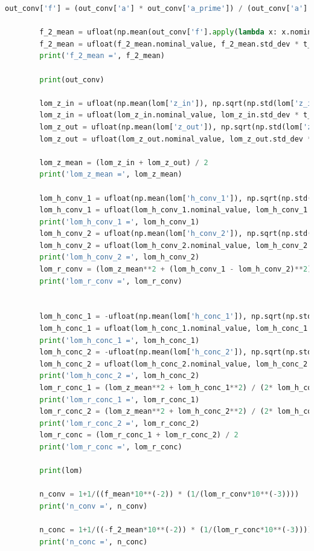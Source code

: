 \documentclass[a4paper,11pt]{article}
\begin{document}
\begin{lstlisting}[language=Python, basicstyle=\tiny, breaklines=true, postbreak=\mbox{\textbackslashspace}]
        out_conv['f'] = (out_conv['a'] * out_conv['a_prime']) / (out_conv['a'] - out_conv['a_prime'])

        f_2_mean = ufloat(np.mean(out_conv['f'].apply(lambda x: x.nominal_value)), np.sqrt(np.std(out_conv['f'].apply(lambda x: x.nominal_value))**2 + np.mean(out_conv['f'].apply(lambda x: x.std_dev))**2))
        f_2_mean = ufloat(f_2_mean.nominal_value, f_2_mean.std_dev * t_coeff(len(out_conv['f'])))
        print('f_2_mean =', f_2_mean)

        print(out_conv)

        lom_z_in = ufloat(np.mean(lom['z_in']), np.sqrt(np.std(lom['z_in'])**2 + 0.01**2))
        lom_z_in = ufloat(lom_z_in.nominal_value, lom_z_in.std_dev * t_coeff(len(lom['z_in'])))
        lom_z_out = ufloat(np.mean(lom['z_out']), np.sqrt(np.std(lom['z_out'])**2 + 0.01**2))
        lom_z_out = ufloat(lom_z_out.nominal_value, lom_z_out.std_dev * t_coeff(len(lom['z_out'])))

        lom_z_mean = (lom_z_in + lom_z_out) / 2
        print('lom_z_mean =', lom_z_mean)

        lom_h_conv_1 = ufloat(np.mean(lom['h_conv_1']), np.sqrt(np.std(lom['h_conv_1'])**2 + 0.01**2))
        lom_h_conv_1 = ufloat(lom_h_conv_1.nominal_value, lom_h_conv_1.std_dev * t_coeff(len(lom['h_conv_1'])))
        print('lom_h_conv_1 =', lom_h_conv_1)
        lom_h_conv_2 = ufloat(np.mean(lom['h_conv_2']), np.sqrt(np.std(lom['h_conv_2'])**2 + 0.01**2))
        lom_h_conv_2 = ufloat(lom_h_conv_2.nominal_value, lom_h_conv_2.std_dev * t_coeff(len(lom['h_conv_2'])))
        print('lom_h_conv_2 =', lom_h_conv_2)
        lom_r_conv = (lom_z_mean**2 + (lom_h_conv_1 - lom_h_conv_2)**2) / (2* (lom_h_conv_1 - lom_h_conv_2))
        print('lom_r_conv =', lom_r_conv)


        lom_h_conc_1 = -ufloat(np.mean(lom['h_conc_1']), np.sqrt(np.std(lom['h_conc_1'])**2 + 0.01**2))
        lom_h_conc_1 = ufloat(lom_h_conc_1.nominal_value, lom_h_conc_1.std_dev * t_coeff(len(lom['h_conc_1'])))
        print('lom_h_conc_1 =', lom_h_conc_1)
        lom_h_conc_2 = -ufloat(np.mean(lom['h_conc_2']), np.sqrt(np.std(lom['h_conc_2'])**2 + 0.01**2))
        lom_h_conc_2 = ufloat(lom_h_conc_2.nominal_value, lom_h_conc_2.std_dev * t_coeff(len(lom['h_conc_2'])))
        print('lom_h_conc_2 =', lom_h_conc_2)
        lom_r_conc_1 = (lom_z_mean**2 + lom_h_conc_1**2) / (2* lom_h_conc_1)
        print('lom_r_conc_1 =', lom_r_conc_1)
        lom_r_conc_2 = (lom_z_mean**2 + lom_h_conc_2**2) / (2* lom_h_conc_2)
        print('lom_r_conc_2 =', lom_r_conc_2)
        lom_r_conc = (lom_r_conc_1 + lom_r_conc_2) / 2
        print('lom_r_conc =', lom_r_conc)

        print(lom)

        n_conv = 1+1/((f_mean*10**(-2)) * (1/(lom_r_conv*10**(-3))))
        print('n_conv =', n_conv)

        n_conc = 1+1/((-f_2_mean*10**(-2)) * (1/(lom_r_conc*10**(-3))))
        print('n_conc =', n_conc)
    \end{lstlisting}
\end{document}
